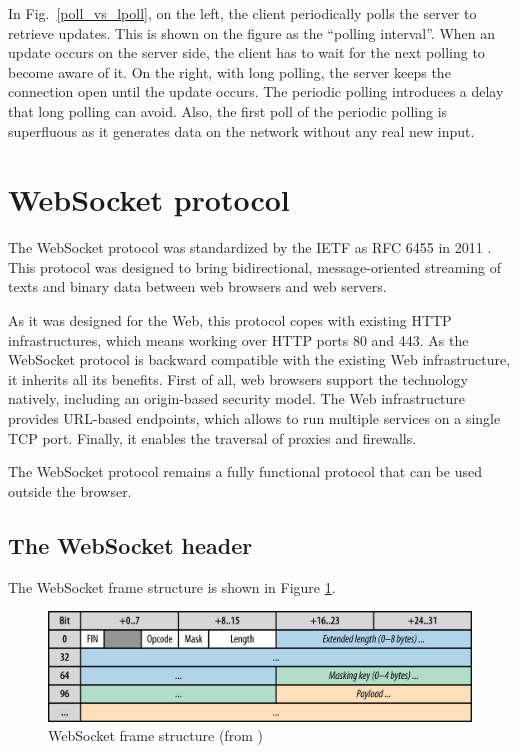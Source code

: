 \documentclass[10pt,journal,compsoc]{IEEEtran}
\newcommand{\ws}{WebSocket}
\begin{document}
In Fig.~\ref{poll_vs_lpoll}, on the left, the client periodically polls the server to retrieve updates. This is shown on the figure as the ``polling interval''. When an update occurs on the server side, the client has to wait for the next polling to become aware of it. On the right, with long polling, the server keeps the connection open until the update occurs. The periodic polling introduces a delay that long polling can avoid. Also, the first poll of the periodic polling is superfluous as it generates data on the network without any real new input. %

\section{\ws{} protocol}
\label{sec:ws}
The \ws{} protocol was standardized by the IETF as RFC 6455 in 2011 \cite{rfc6455}.
This protocol was designed to bring bidirectional, message-oriented streaming of texts and binary data between web browsers and web servers.

As it was designed for the Web, this protocol copes with existing HTTP infrastructures, which means working over HTTP ports 80 and 443.
As the \ws{} protocol is backward compatible with the existing Web infrastructure, it inherits all its benefits. %
First of all, web browsers support the technology natively, including an origin-based security model. %
The Web infrastructure provides URL-based endpoints, which allows to run multiple services on a single TCP port.
Finally, it enables the traversal of proxies and firewalls.

The \ws{} protocol remains a fully functional protocol that can be used outside the browser.

\subsection{The \ws{} header}
\label{sec:ws-header}
The \ws{} frame structure is shown in Figure \ref{fig:websocket_frame}.

\begin{figure}
    \centering
    \includegraphics[width=\linewidth]{websocket_frame.png}
    \caption{\ws{} frame structure (from \cite{HighPerfBrowserNetworking:websocket})}
    \label{fig:websocket_frame}
\end{figure}
\end{document}
